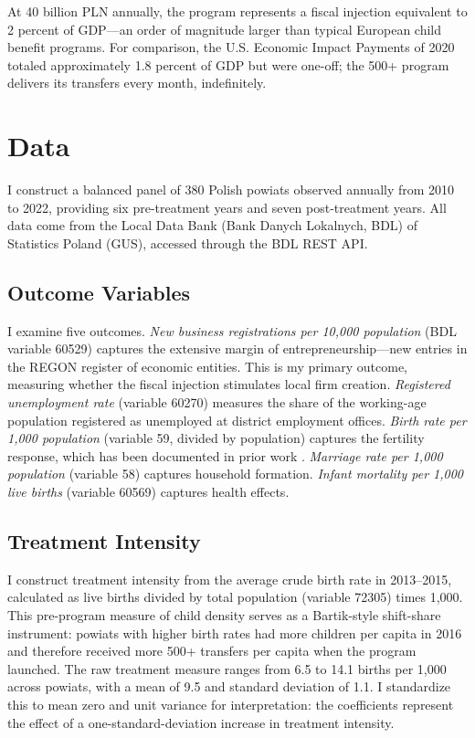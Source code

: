 \documentclass[12pt]{article}
\begin{document}
At 40 billion PLN annually, the program represents a fiscal injection equivalent to 2 percent of GDP---an order of magnitude larger than typical European child benefit programs. For comparison, the U.S. Economic Impact Payments of 2020 totaled approximately 1.8 percent of GDP but were one-off; the 500+ program delivers its transfers every month, indefinitely.


\section{Data}

I construct a balanced panel of 380 Polish powiats observed annually from 2010 to 2022, providing six pre-treatment years and seven post-treatment years. All data come from the Local Data Bank (Bank Danych Lokalnych, BDL) of Statistics Poland (GUS), accessed through the BDL REST API.

\subsection{Outcome Variables}

I examine five outcomes. \emph{New business registrations per 10,000 population} (BDL variable 60529) captures the extensive margin of entrepreneurship---new entries in the REGON register of economic entities. This is my primary outcome, measuring whether the fiscal injection stimulates local firm creation. \emph{Registered unemployment rate} (variable 60270) measures the share of the working-age population registered as unemployed at district employment offices. \emph{Birth rate per 1,000 population} (variable 59, divided by population) captures the fertility response, which has been documented in prior work \citep{gromadzki2024fertility}. \emph{Marriage rate per 1,000 population} (variable 58) captures household formation. \emph{Infant mortality per 1,000 live births} (variable 60569) captures health effects.

\subsection{Treatment Intensity}

I construct treatment intensity from the average crude birth rate in 2013--2015, calculated as live births divided by total population (variable 72305) times 1,000. This pre-program measure of child density serves as a Bartik-style shift-share instrument: powiats with higher birth rates had more children per capita in 2016 and therefore received more 500+ transfers per capita when the program launched. The raw treatment measure ranges from 6.5 to 14.1 births per 1,000 across powiats, with a mean of 9.5 and standard deviation of 1.1. I standardize this to mean zero and unit variance for interpretation: the coefficients represent the effect of a one-standard-deviation increase in treatment intensity.
\end{document}
